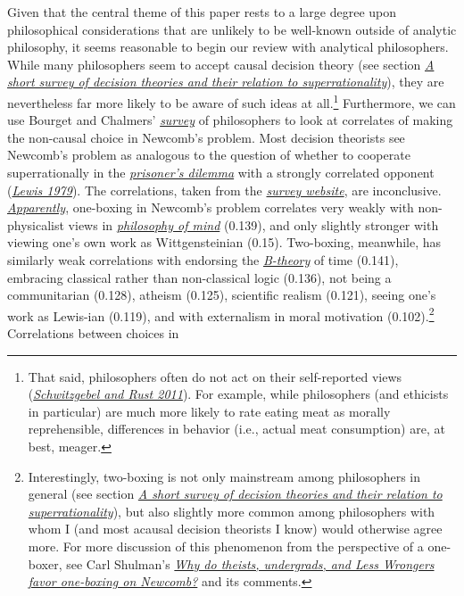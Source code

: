 Given that the central theme of this paper rests to a large degree upon
philosophical considerations that are unlikely to be well-known outside
of analytic philosophy, it seems reasonable to begin our review with
analytical philosophers. While many philosophers seem to accept causal
decision theory (see section
\protect\hyperlink{a-short-survey-of-decision-theories-and-their-relation-to-superrationality}{\emph{A
short survey of decision theories and their relation to
superrationality}}), they are nevertheless far more likely to be aware
of such ideas at all.\footnote{That said, philosophers often do not act
  on their self-reported views
  (\href{http://www.faculty.ucr.edu/~eschwitz/SchwitzAbs/EthSelfRep.htm}{\emph{Schwitzgebel
  and Rust 2011}}). For example, while philosophers (and ethicists in
  particular) are much more likely to rate eating meat as morally
  reprehensible, differences in behavior (i.e., actual meat consumption)
  are, at best, meager.} Furthermore, we can use Bourget and Chalmers'
\href{http://philpapers.org/archive/BOUWDP}{\emph{survey}} of
philosophers to look at correlates of making the non-causal choice in
Newcomb's problem. Most decision theorists see Newcomb's problem as
analogous to the question of whether to cooperate superrationally in the
\href{https://en.wikipedia.org/wiki/Prisoner\%27s_dilemma}{\emph{prisoner's
dilemma}} with a strongly correlated opponent
(\href{https://sl4librarian.files.wordpress.com/2017/01/lewis-prisoners-dilemma-newcomb-problem.pdf}{\emph{Lewis
1979}}). The correlations, taken from the
\href{http://philpapers.org/surveys}{\emph{survey website}}, are
inconclusive.
\href{http://philpapers.org/surveys/linear_most.pl}{\emph{Apparently}},
one-boxing in Newcomb's problem correlates very weakly with
non-physicalist views in
\href{https://en.wikipedia.org/wiki/Philosophy_of_mind}{\emph{philosophy
of mind}} (0.139), and only slightly stronger with viewing one's own
work as Wittgensteinian (0.15). Two-boxing, meanwhile, has similarly
weak correlations with endorsing the
\href{https://en.wikipedia.org/wiki/B-theory_of_time}{\emph{B-theory}}
of time (0.141), embracing classical rather than non-classical logic
(0.136), not being a communitarian (0.128), atheism (0.125), scientific
realism (0.121), seeing one's work as Lewis-ian (0.119), and with
externalism in moral motivation (0.102).\footnote{Interestingly,
  two-boxing is not only mainstream among philosophers in general (see
  section
  \protect\hyperlink{a-short-survey-of-decision-theories-and-their-relation-to-superrationality}{\emph{A
  short survey of decision theories and their relation to
  superrationality}}), but also slightly more common among
  philosophers with whom I (and most acausal decision theorists I know)
  would otherwise agree more. For more discussion of this phenomenon
  from the perspective of a one-boxer, see Carl Shulman's
  \href{http://lesswrong.com/lw/hqs/why_do_theists_undergrads_and_less_wrongers_favor/}{\emph{\emph{Why
  do theists, undergrads, and Less Wrongers favor one-boxing on
  Newcomb?}}} and its comments.} Correlations between choices in
